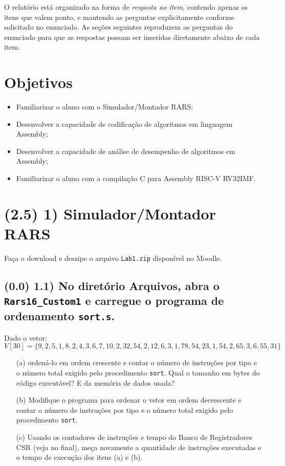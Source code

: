 \documentclass[12pt,a4paper]{article}
\begin{document}
O relatório está organizado na forma de \emph{resposta ao item}, contendo apenas os itens que valem ponto, e mantendo as perguntas explicitamente conforme solicitado no enunciado. As seções seguintes reproduzem as perguntas do enunciado para que as respostas possam ser inseridas diretamente abaixo de cada item.

\section*{Objetivos}
\begin{itemize}
    \item Familiarizar o aluno com o Simulador/Montador RARS;
    \item Desenvolver a capacidade de codificação de algoritmos em linguagem Assembly;
    \item Desenvolver a capacidade de análise de desempenho de algoritmos em Assembly;
    \item Familiarizar o aluno com a compilação C para Assembly RISC-V RV32IMF.
\end{itemize}

\section*{(2.5) 1) Simulador/Montador RARS}
Faça o download e deszipe o arquivo \texttt{Lab1.zip} disponível no Moodle.

\subsection*{(0.0) 1.1) No diretório Arquivos, abra o \texttt{Rars16\_Custom1} e carregue o programa de ordenamento \texttt{sort.s}.}
Dado o vetor:
\[
V[30]=\{9,2,5,1,8,2,4,3,6,7,10,2,32,54,2,12,6,3,1,78,54,23,1,54,2,65,3,6,55,31\}
\]

\begin{enumerate}
    \item[(a)] ordená-lo em ordem crescente e contar o número de instruções por tipo e o número total exigido pelo procedimento \texttt{sort}. Qual o tamanho em bytes do código executável? E da memória de dados usada?
    \item[(b)] Modifique o programa para ordenar o vetor em ordem decrescente e contar o número de instruções por tipo e o número total exigido pelo procedimento \texttt{sort}.
    \item[(c)] Usando os contadores de instruções e tempo do Banco de Registradores CSR (veja no final), meça novamente a quantidade de instruções executadas e o tempo de execução dos itens (a) e (b).
\end{enumerate}
\end{document}
